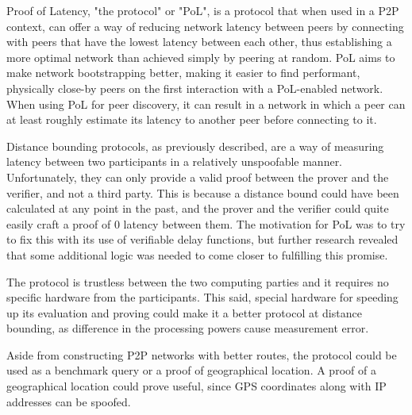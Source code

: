Proof of Latency, "the protocol" or "PoL", is a protocol that when used in a P2P context, can offer a way of reducing network latency between peers by connecting with peers that have the lowest latency between each other, thus establishing a more optimal network than achieved simply by peering at random. PoL aims to make network bootstrapping better, making it easier to find performant, physically close-by peers on the first interaction with a PoL-enabled network. When using PoL for peer discovery, it can result in a network in which a peer can at least roughly estimate its latency to another peer before connecting to it.

Distance bounding protocols, as previously described, are a way of measuring latency between two participants in a relatively unspoofable manner. Unfortunately, they can only provide a valid proof between the prover and the verifier, and not a third party. This is because a distance bound could have been calculated at any point in the past, and the prover and the verifier could quite easily craft a proof of 0 latency between them. The motivation for PoL was to try to fix this with its use of verifiable delay functions, but further research revealed that some additional logic was needed to come closer to fulfilling this promise.

The protocol is trustless between the two computing parties and it requires no specific hardware from the participants. This said, special hardware for speeding up its evaluation and proving could make it a better protocol at distance bounding, as difference in the processing powers cause measurement error.

Aside from constructing P2P networks with better routes, the protocol could be used as a benchmark query or a proof of geographical location. A proof of a geographical location could prove useful, since GPS coordinates along with IP addresses can be spoofed.

